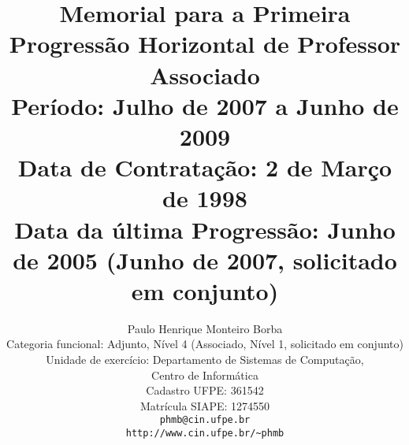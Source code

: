 \documentclass[11pt]{article}
\begin{document}
\title{Memorial para a Primeira Progressão Horizontal de Professor Associado \\
       Período: Julho de 2007 a Junho de 2009\\
       Data de Contratação: 2 de Março de 1998 \\
       Data da última Progressão: Junho de 2005 (Junho de 2007, solicitado em conjunto)}
\author{Paulo Henrique Monteiro Borba \\
        Categoria funcional: Adjunto, Nível 4 (Associado, Nível 1, solicitado em conjunto)\\
        Unidade de exercício: Departamento de Sistemas de Computação, \\
                              Centro de Informática \\
        Cadastro UFPE: 361542 \\
        Matrícula SIAPE: 1274550 \\
        \texttt{phmb@cin.ufpe.br} \\
        \texttt{http://www.cin.ufpe.br/\~{}phmb}}
\date{}
\maketitle
\newpage
\end{document}
